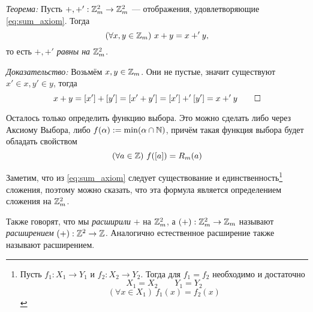 \vspace{1em}
{\it Теорема:} Пусть $+,+':\mathbb Z_{m}^{2}\to\mathbb Z_{m}^{2}$ --- отображения,
удовлетворяющие \eqref{eq:sum_axiom}. Тогда
\[
  (\forall x,y\in\mathbb Z_{m})~x+y=x+'y,
\]
то есть $+,+'$ {\it равны на} $\mathbb Z_{m}^{2}$.

{\it Доказательство:} Возьмём $x,y\in\mathbb Z_{m}$. Они не пустые, значит
существуют $x'\in x,y'\in y$, тогда
\[
  x+y=[x']+[y']=[x'+y']=[x']+'[y']=x+'y\qed
\]

Осталось только определить функцию выбора. Это можно сделать либо через
Аксиому Выбора, либо $f(\alpha):=\min(\alpha\cap\mathbb N)$, причём такая функция
выбора будет обладать свойством
\[
  (\forall a\in\mathbb Z)~f([a])=R_{m}(a)
\]

Заметим, что из \eqref{eq:sum_axiom} следует существование
и единственность\footnote{Пусть $f_1:X_1\to Y_1$ и $f_2:X_2\to Y_2$.
  Тогда для $f_1=f_2$ необходимо и достаточно
  \[
    X_1=X_2\qquad Y_1=Y_2
  \]
  \[
    (\forall x\in X_1)~f_1(x)=f_2(x)
  \]
}
сложения, поэтому можно сказать, что эта формула является определением
сложения на $\mathbb Z_{m}^{2}$.

Также говорят, что мы {\it расширили} $+$ на $\mathbb Z_{m}^{2}$,
а $(+):\mathbb Z_{m}^{2}\to\mathbb Z_{m}$ называют {\it расширением} $(+):\mathbb Z^{2}\to\mathbb Z$.
Аналогично естественное расширение также называют расширением.

